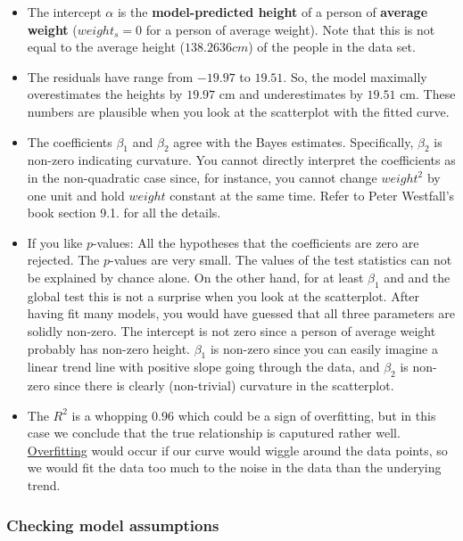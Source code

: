 \documentclass[
]{book}
\providecommand{\tightlist}{%
  \setlength{\itemsep}{0pt}\setlength{\parskip}{0pt}}
\begin{document}
\begin{itemize}
\tightlist
\item
  The intercept \(\alpha\) is the \textbf{model-predicted height} of a person of \textbf{average weight}
  (\(weight_s=0\) for a person of average weight).
  Note that this is not equal to the average height (\(138.2636 cm\)) of the people in the data set.
\item
  The residuals have range from \(-19.97\) to \(19.51\). So, the model maximally
  overestimates the heights by \(19.97\) cm and underestimates by \(19.51\) cm.
  These numbers are plausible when you look at the scatterplot with the fitted
  curve.
\item
  The coefficients \(\beta_1\) and \(\beta_2\) agree with the Bayes estimates.
  Specifically, \(\beta_2\) is non-zero indicating curvature. You cannot directly interpret the coefficients
  as in the non-quadratic case since, for instance, you cannot change \(weight^2\) by one unit
  and hold \(weight\) constant at the same time. Refer to Peter Westfall's book section 9.1. for all the details.
\item
  If you like \(p\)-values: All the hypotheses that the coefficients are zero
  are rejected. The \(p\)-values are very small. The values of the test statistics can not be explained
  by chance alone. On the other hand, for at least \(\beta_1\) and
  and the global test this is not a surprise when you look at the scatterplot.
  After having fit many models, you would have guessed that all three parameters
  are solidly non-zero. The intercept is not zero since a person of average weight probably
  has non-zero height. \(\beta_1\) is non-zero since you can easily imagine a linear
  trend line with positive slope going through the data, and \(\beta_2\) is non-zero
  since there is clearly (non-trivial) curvature in the scatterplot.
\item
  The \(R^2\) is a whopping \(0.96\) which could be a sign of overfitting, but
  in this case we conclude that the true relationship is caputured rather well.
  \href{https://en.wikipedia.org/wiki/Overfitting}{Overfitting} would occur if
  our curve would wiggle around the data points,
  so we would fit the data too much to the noise in the data than
  the underying trend.
\end{itemize}

\subsubsection{Checking model assumptions}\label{checking-model-assumptions}
\end{document}
